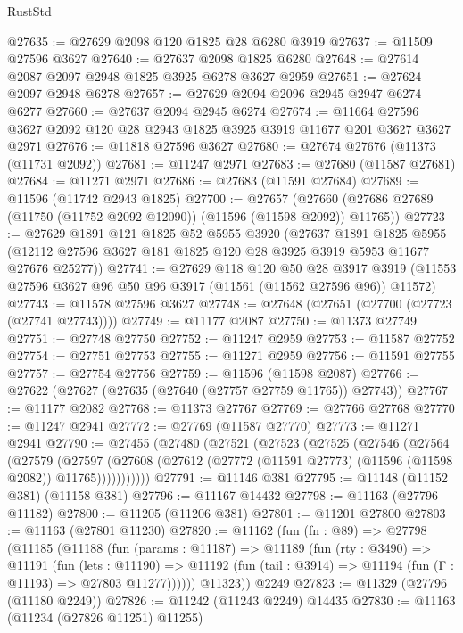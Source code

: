 \begin{lexlean}{RustStd}
\begin{coremodule}
@27635 := @27629 @2098 @120 @1825 @28 @6280 @3919
@27637 := @11509 @27596 @3627
@27640 := @27637 @2098 @1825 @6280
@27648 := @27614 @2087 @2097 @2948 @1825 @3925 @6278 @3627 @2959
@27651 := @27624 @2097 @2948 @6278
@27657 := @27629 @2094 @2096 @2945 @2947 @6274 @6277
@27660 := @27637 @2094 @2945 @6274
@27674 := @11664 @27596 @3627 @2092 @120 @28 @2943 @1825 @3925 @3919 @11677 @201 @3627 @3627 @2971
@27676 := @11818 @27596 @3627
@27680 := @27674 @27676 (@11373 (@11731 @2092))
@27681 := @11247 @2971
@27683 := @27680 (@11587 @27681)
@27684 := @11271 @2971
@27686 := @27683 (@11591 @27684)
@27689 := @11596 (@11742 @2943 @1825)
@27700 := @27657
    (@27660 (@27686 @27689 (@11750 (@11752 @2092 @12090)) (@11596 (@11598 @2092)) @11765))
@27723 := @27629
    @1891
    @121
    @1825
    @52
    @5955
    @3920
    (@27637
      @1891
      @1825
      @5955
      (@12112 @27596 @3627 @181 @1825 @120 @28 @3925 @3919 @5953 @11677 @27676 @25277))
@27741 := @27629
    @118
    @120
    @50
    @28
    @3917
    @3919
    (@11553 @27596 @3627 @96 @50 @96 @3917 (@11561 (@11562 @27596 @96)) @11572)
@27743 := @11578 @27596 @3627
@27748 := @27648 (@27651 (@27700 (@27723 (@27741 @27743))))
@27749 := @11177 @2087
@27750 := @11373 @27749
@27751 := @27748 @27750
@27752 := @11247 @2959
@27753 := @11587 @27752
@27754 := @27751 @27753
@27755 := @11271 @2959
@27756 := @11591 @27755
@27757 := @27754 @27756
@27759 := @11596 (@11598 @2087)
@27766 := @27622 (@27627 (@27635 (@27640 (@27757 @27759 @11765)) @27743))
@27767 := @11177 @2082
@27768 := @11373 @27767
@27769 := @27766 @27768
@27770 := @11247 @2941
@27772 := @27769 (@11587 @27770)
@27773 := @11271 @2941
@27790 := @27455
    (@27480
      (@27521
        (@27523
          (@27525
            (@27546
              (@27564
                (@27579
                  (@27597
                    (@27608
                      (@27612 (@27772 (@11591 @27773) (@11596 (@11598 @2082)) @11765)))))))))))
@27791 := @11146 @381
@27795 := @11148 (@11152 @381) (@11158 @381)
@27796 := @11167 @14432
@27798 := @11163 (@27796 @11182)
@27800 := @11205 (@11206 @381)
@27801 := @11201 @27800
@27803 := @11163 (@27801 @11230)
@27820 := @11162
    (fun (fn : @89) =>
    @27798
      (@11185
        (@11188
          (fun (params : @11187) =>
          @11189
            (fun (rty : @3490) =>
            @11191
              (fun (lets : @11190) =>
              @11192 (fun (tail : @3914) => @11194 (fun (Γ : @11193) => @27803 @11277))))))
        @11323))
    @2249
@27823 := @11329 (@27796 (@11180 @2249))
@27826 := @11242 (@11243 @2249) @14435
@27830 := @11163 (@11234 (@27826 @11251) @11255)

\end{coremodule}
\end{lexlean}
